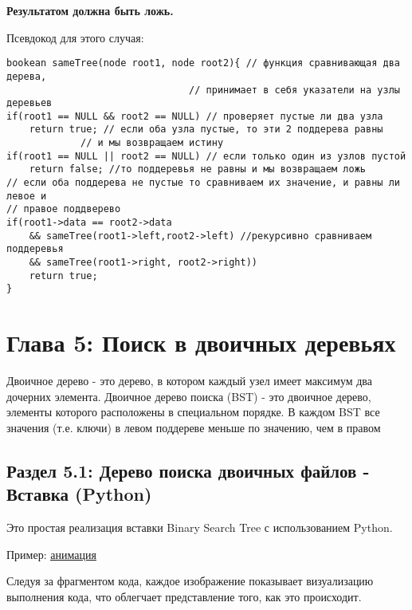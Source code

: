 {\bfseries Результатом должна быть ложь.}

\vspace{\baselineskip}
Псевдокод для этого случая:

\vspace{\baselineskip}
\begin{tcolorbox}
\begin{verbatim}
bookean sameTree(node root1, node root2){ // функция сравнивающая два дерева,
								// принимает в себя указатели на узлы деревьев	
if(root1 == NULL && root2 == NULL) // проверяет пустые ли два узла	
	return true; // если оба узла пустые, то эти 2 поддерева равны 
			 // и мы возвращаем истину		
if(root1 == NULL || root2 == NULL) // если только один из узлов пустой		
	return false; //то поддеревья не равны и мы возвращаем ложь
// если оба поддерева не пустые то сравниваем их значение, и равны ли левое и
// правое поддверево			
if(root1->data == root2->data 
	&& sameTree(root1->left,root2->left) //рекурсивно сравниваем поддеревья
	&& sameTree(root1->right, root2->right))	
	return true;
}
\end{verbatim}
\end{tcolorbox}

\chapter*{Глава 5: Поиск в двоичных деревьях}

Двоичное дерево - это дерево, в котором каждый узел имеет максимум два дочерних элемента. Двоичное дерево поиска (BST) - это двоичное дерево, элементы которого расположены в специальном порядке. В каждом BST все значения (т.е. ключи) в левом поддереве меньше по значению, чем в правом

\vspace{\baselineskip}
\section*{Раздел 5.1: Дерево поиска двоичных файлов - Вставка (Python)}

\vspace{\baselineskip}
Это простая реализация вставки Binary Search Tree  с использованием Python.

\vspace{\baselineskip}
Пример: \href{http://i.stack.imgur.com/3NG0e.gif}{\underline{анимация}}

\vspace{\baselineskip}
Следуя за фрагментом кода, каждое изображение показывает визуализацию выполнения кода, что облегчает представление того, как это происходит.

